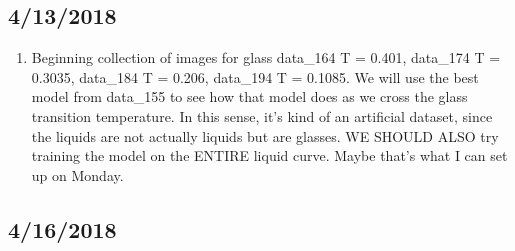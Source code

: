 \documentclass[12pt,reqno]{amsart}
\numberwithin{equation}{section}
\begin{document}
\subsection{4/13/2018}

\begin{enumerate}
\item Beginning collection of images for glass data\_164 T = 0.401, data\_174 T = 0.3035, data\_184 T = 0.206, data\_194 T = 0.1085.  We will use the best model from data\_155 to see how that model does as we cross the glass transition temperature.  In this sense, it's kind of an artificial dataset, since the liquids are not actually liquids but are glasses.  WE SHOULD ALSO try training the model on the ENTIRE liquid curve.  Maybe that's what I can set up on Monday.  
\end{enumerate}

\subsection{4/16/2018}
\end{document}
